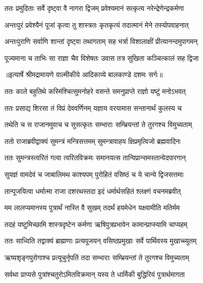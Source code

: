 \twolineshloka
{ततः प्रमुदिताः सर्वे दृष्ट्वा वै नागरा द्विजम्}
{प्रवेश्यमानं सत्कृत्य नरेन्द्रेणेन्द्रकर्मणा} %

\twolineshloka
{अन्तःपुरं प्रवेश्यैनं पूजां कृत्वा तु शास्त्रतः}
{कृतकृत्यं तदात्मानं मेने तस्योपवाहनात्} %

\twolineshloka
{अन्तःपुराणि सर्वाणि शान्तां दृष्ट्वा तथागताम्}
{सह भर्त्रा विशालाक्षीं प्रीत्यानन्दमुपागमन्} %

\twolineshloka
{पूज्यमाना च ताभिः सा राज्ञा चैव विशेषतः}
{उवास तत्र सुखिता कञ्चित्कालं सह द्विजा} %


{॥इत्यार्षे श्रीमद्रामायणे वाल्मीकीये आदिकाव्ये बालकाण्डे दशमः सर्गः॥}


\twolineshloka
{ततः काले बहुतिथे कस्मिंश्चित्सुमनोहरे}
{वसन्ते समनुप्राप्ते राज्ञो यष्टुं मनोऽभवत्} %

\twolineshloka
{ततः प्रसाद्य शिरसा तं विप्रं देववर्णिनम्}
{यज्ञाय वरयामास सन्तानार्थं कुलस्य च} %

\twolineshloka
{तथेति च स राजानमुवाच च सुसत्कृतः}
{सम्भाराः सम्भ्रियन्तां ते तुरगश्च विमुच्यताम्} %

\twolineshloka
{ततो राजाब्रवीद्वाक्यं सुमन्त्रं मन्त्रिसत्तमम्}
{सुमन्त्रावाहय क्षिप्रमृत्विजो ब्रह्मवादिनः} %

\twolineshloka
{ततः सुमन्त्रस्त्वरितं गत्वा त्वरितविक्रमः}
{समानयत्स तान्विप्रान्समस्तान्वेदपारगान्} %

\twolineshloka
{सुयज्ञं वामदेवं च जाबालिमथ काश्यपम्}
{पुरोहितं वसिष्ठं च ये चान्ये द्विजसत्तमाः} %

\twolineshloka
{तान्पूजयित्वा धर्मात्मा राजा दशरथस्तदा}
{इदं धर्मार्थसहितं श्लक्ष्णं वचनमब्रवीत्} %

\twolineshloka
{मम लालप्यमानस्य पुत्रार्थं नास्ति वै सुखम्}
{तदर्थं हयमेधेन यक्ष्यामीति मतिर्मम} %

\twolineshloka
{तदहं यष्टुमिच्छामि शास्त्रदृष्टेन कर्मणा}
{ऋषिपुत्रप्रभावेन कामान्प्राप्स्यामि चाप्यहम्} %

\twolineshloka
{ततः साध्विति तद्वाक्यं ब्राह्मणाः प्रत्यपूजयन्}
{वसिष्ठप्रमुखाः सर्वे पार्थिवस्य मुखाच्च्युतम्} %

\twolineshloka
{ऋष्यशृङ्गपुरोगाश्च प्रत्यूचुर्नृपतिं तदा}
{सम्भाराः सम्भ्रियन्तां ते तुरगश्च विमुच्यताम्} %

\twolineshloka
{सर्वथा प्राप्यसे पुत्रांश्चतुरोऽमितविक्रमान्}
{यस्य ते धार्मिकी बुद्धिरियं पुत्रार्थमागता} %

